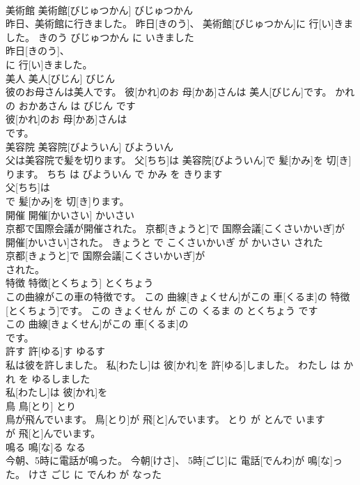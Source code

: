 \documentclass[8pt]{extreport}
\begin{document}
\begin{CJK}{UTF8}{min}
\\	美術館	美術館[びじゅつかん]	びじゅつかん	
\\	昨日、美術館に行きました。	昨日[きのう]、 美術館[びじゅつかん]に 行[い]きました。	きのう びじゅつかん に いきました	
\\	昨日[きのう]、
\\	に 行[い]きました。			
\\	美人	美人[びじん]	びじん	
\\	彼のお母さんは美人です。	彼[かれ]のお 母[かあ]さんは 美人[びじん]です。	かれ の おかあさん は びじん です	
\\	彼[かれ]のお 母[かあ]さんは
\\	です。			
\\	美容院	美容院[びよういん]	びよういん	
\\	父は美容院で髪を切ります。	父[ちち]は 美容院[びよういん]で 髪[かみ]を 切[き]ります。	ちち は びよういん で かみ を きります	
\\	父[ちち]は
\\	で 髪[かみ]を 切[き]ります。			
\\	開催	開催[かいさい]	かいさい	
\\	京都で国際会議が開催された。	京都[きょうと]で 国際会議[こくさいかいぎ]が 開催[かいさい]された。	きょうと で こくさいかいぎ が かいさい された	
\\	京都[きょうと]で 国際会議[こくさいかいぎ]が
\\	された。			
\\	特徴	特徴[とくちょう]	とくちょう	
\\	この曲線がこの車の特徴です。	この 曲線[きょくせん]がこの 車[くるま]の 特徴[とくちょう]です。	この きょくせん が この くるま の とくちょう です	
\\	この 曲線[きょくせん]がこの 車[くるま]の
\\	です。			
\\	許す	許[ゆる]す	ゆるす	
\\	私は彼を許しました。	私[わたし]は 彼[かれ]を 許[ゆる]しました。	わたし は かれ を ゆるしました	
\\	私[わたし]は 彼[かれ]を
\\	鳥	鳥[とり]	とり	
\\	鳥が飛んでいます。	鳥[とり]が 飛[と]んでいます。	とり が とんで います	
\\	が 飛[と]んでいます。			
\\	鳴る	鳴[な]る	なる	
\\	今朝、5時に電話が鳴った。	今朝[けさ]、 5時[ごじ]に 電話[でんわ]が 鳴[な]った。	けさ ごじ に でんわ が なった	

\end{CJK}
\end{document}
